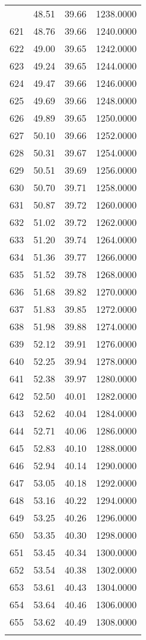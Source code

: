 \documentclass[
  captions=tableheading,
]{scrartcl}
\begin{document}
\begin{longtable} {l|l|l|l}
{620	& 48.51	& 39.66	& 1238.0000\\
621	& 48.76	& 39.66	& 1240.0000\\
622	& 49.00	& 39.65	& 1242.0000\\
623	& 49.24	& 39.65	& 1244.0000\\
624	& 49.47	& 39.66	& 1246.0000\\
625	& 49.69	& 39.66	& 1248.0000\\
626	& 49.89	& 39.65	& 1250.0000\\
627	& 50.10	& 39.66	& 1252.0000\\
628	& 50.31	& 39.67	& 1254.0000\\
629	& 50.51	& 39.69	& 1256.0000\\
630	& 50.70	& 39.71	& 1258.0000\\
631	& 50.87	& 39.72	& 1260.0000\\
632	& 51.02	& 39.72	& 1262.0000\\
633	& 51.20	& 39.74	& 1264.0000\\
634	& 51.36	& 39.77	& 1266.0000\\
635	& 51.52	& 39.78	& 1268.0000\\
636	& 51.68	& 39.82	& 1270.0000\\
637	& 51.83	& 39.85	& 1272.0000\\
638	& 51.98	& 39.88	& 1274.0000\\
639	& 52.12	& 39.91	& 1276.0000\\
640	& 52.25	& 39.94	& 1278.0000\\
641	& 52.38	& 39.97	& 1280.0000\\
642	& 52.50	& 40.01	& 1282.0000\\
643	& 52.62	& 40.04	& 1284.0000\\
644	& 52.71	& 40.06	& 1286.0000\\
645	& 52.83	& 40.10	& 1288.0000\\
646	& 52.94	& 40.14	& 1290.0000\\
647	& 53.05	& 40.18	& 1292.0000\\
648	& 53.16	& 40.22	& 1294.0000\\
649	& 53.25	& 40.26	& 1296.0000\\
650	& 53.35	& 40.30	& 1298.0000\\
651	& 53.45	& 40.34	& 1300.0000\\
652	& 53.54	& 40.38	& 1302.0000\\
653	& 53.61	& 40.43	& 1304.0000\\
654	& 53.64	& 40.46	& 1306.0000\\
655	& 53.62	& 40.49	& 1308.0000\\
}
\end{longtable}
\end{document}
